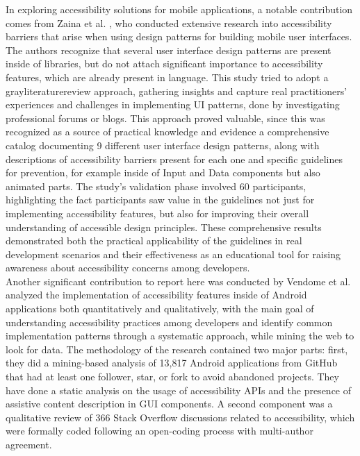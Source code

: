 In exploring accessibility solutions for mobile applications, a notable contribution comes from Zaina et al. \cite{zaina2022preventing}, who conducted extensive research into accessibility barriers that arise when using design patterns for building mobile user interfaces. The authors recognize that several user interface design patterns are present inside of libraries, but do not attach significant importance to accessibility features, which are already present in language. This study tried to adopt a \gls{grayliteraturereview} approach, gathering insights and capture real practitioners' experiences and challenges in implementing UI patterns, done by investigating professional forums or blogs. This approach proved valuable, since this was recognized as a source of practical knowledge and evidence a comprehensive catalog documenting 9 different user interface design patterns, along with descriptions of accessibility barriers present for each one and specific guidelines for prevention, for example inside of Input and Data components but also animated parts. The study's validation phase involved 60 participants, highlighting the fact participants saw value in the guidelines not just for implementing accessibility features, but also for improving their overall understanding of accessible design principles. These comprehensive results demonstrated both the practical applicability of the guidelines in real development scenarios and their effectiveness as an educational tool for raising awareness about accessibility concerns among developers.\\

Another significant contribution to report here was conducted by Vendome et al. \cite{vendome2019can} analyzed the implementation of accessibility features inside of Android applications both quantitatively and qualitatively, with the main goal of understanding accessibility practices among developers and identify common implementation patterns through a systematic approach, while mining the web to look for data. The methodology of the research contained two major parts: first, they did a mining-based analysis of 13,817 Android applications from GitHub that had at least one follower, star, or fork to avoid abandoned projects. They have done a static analysis on the usage of accessibility APIs and the presence of assistive content description in GUI components. A second component was a qualitative review of 366 Stack Overflow discussions related to accessibility, which were formally coded following an open-coding process with multi-author agreement. \\

